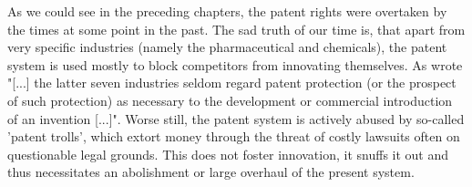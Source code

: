 \documentclass[a4paper]{report}
\begin{document}
As we could see in the preceding chapters, the patent rights were overtaken by the times at some point in the past. The sad truth of our time is, that apart from very specific industries (namely the pharmaceutical and chemicals), the patent system is used mostly to block competitors from innovating themselves. As \autocite{Mansfield1986} wrote "[...] the latter seven industries seldom regard patent protection (or the prospect of such protection) as necessary to the development or commercial introduction of an invention [...]". Worse still, the patent system is actively abused by so-called 'patent trolls', which extort money through the threat of costly lawsuits often on questionable legal grounds. This does not foster innovation, it snuffs it out and thus necessitates an abolishment or large overhaul of the present system.

\newpage

\printbibliography
\end{document}
